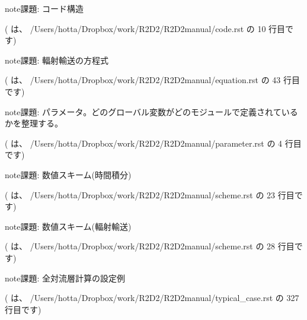 \documentclass[letterpaper,10pt,dvipdfmx,report]{sphinxmanual}
\begin{document}
\begin{sphinxadmonition}{note}{課題:}
コード構造
\end{sphinxadmonition}

({\hyperref[\detokenize{code:id5}]{}} は、 /Users/hotta/Dropbox/work/R2D2/R2D2\sphinxhyphen{}manual/code.rst の 10 行目です)

\begin{sphinxadmonition}{note}{課題:}
輻射輸送の方程式
\end{sphinxadmonition}

({\hyperref[\detokenize{equation:id4}]{}} は、 /Users/hotta/Dropbox/work/R2D2/R2D2\sphinxhyphen{}manual/equation.rst の 43 行目です)

\begin{sphinxadmonition}{note}{課題:}
パラメータ。どのグローバル変数がどのモジュールで定義されているかを整理する。
\end{sphinxadmonition}

({\hyperref[\detokenize{parameter:id2}]{}} は、 /Users/hotta/Dropbox/work/R2D2/R2D2\sphinxhyphen{}manual/parameter.rst の 4 行目です)

\begin{sphinxadmonition}{note}{課題:}
数値スキーム(時間積分)
\end{sphinxadmonition}

({\hyperref[\detokenize{scheme:id4}]{}} は、 /Users/hotta/Dropbox/work/R2D2/R2D2\sphinxhyphen{}manual/scheme.rst の 23 行目です)

\begin{sphinxadmonition}{note}{課題:}
数値スキーム(輻射輸送)
\end{sphinxadmonition}

({\hyperref[\detokenize{scheme:id6}]{}} は、 /Users/hotta/Dropbox/work/R2D2/R2D2\sphinxhyphen{}manual/scheme.rst の 28 行目です)

\begin{sphinxadmonition}{note}{課題:}
全対流層計算の設定例
\end{sphinxadmonition}

({\hyperref[\detokenize{typical_case:id7}]{}} は、 /Users/hotta/Dropbox/work/R2D2/R2D2\sphinxhyphen{}manual/typical\_case.rst の 327 行目です)
\end{document}
